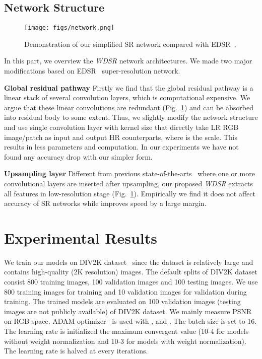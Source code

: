 \documentclass{article}
\begin{document}
\subsection{Network Structure}

\begin{figure}[h]
\centering
\texttt{[image: figs/network.png]}
\caption{Demonstration of our simplified SR network compared with EDSR~\cite{lim2017enhanced}.}
\label{fig:network}
\end{figure}

In this part, we overview the \textit{WDSR} network architectures. We made two major modifications based on EDSR~\cite{lim2017enhanced} super-resolution network.

\textbf{Global residual pathway} Firstly we find that the global residual pathway is a linear stack of several convolution layers, which is computational expensive. We argue that these linear convolutions are redundant (Fig.~\ref{fig:network}) and can be absorbed into residual body to some extent. Thus, we slightly modify the network structure and use single convolution layer with kernel size  that directly take  LR RGB image/patch as input and output  HR counterparts, where  is the scale. This results in less parameters and computation. In our experiments we have not found any accuracy drop with our simpler form.

\textbf{Upsampling layer} Different from previous state-of-the-arts~\cite{lim2017enhanced, 2018arXiv180208797Z} where one or more convolutional layers are inserted after upsampling, our proposed \textit{WDSR} extracts all features in low-resolution stage (Fig.~\ref{fig:network}). Empirically we find it does not affect accuracy of SR networks while improves speed by a large margin. 
\section{Experimental Results}

We train our models on DIV2K dataset~\cite{timofte2017ntire} since the dataset is relatively large and contains high-quality (2K resolution) images. The default splits of DIV2K dataset consist 800 training images, 100 validation images and 100 testing images. We use 800 training images for training and 10 validation images for validation during training. The trained models are evaluated on 100 validation images (testing images are not publicly available) of DIV2K dataset. We mainly measure PSNR on RGB space. ADAM optimizer~\cite{kingma2014adam} is used with ,  and . The batch size is set to 16. The learning rate is initialized the maximum convergent value (10-4 for models without weight normalization and 10-3 for models with weight normalization). The learning rate is halved at every  iterations.
\end{document}
